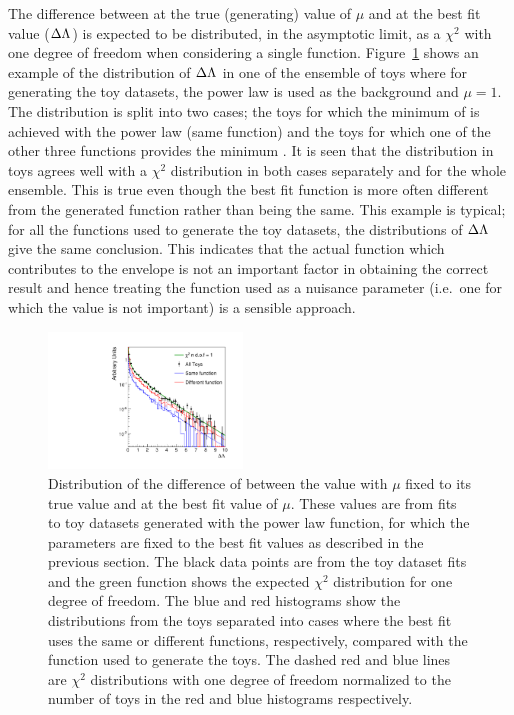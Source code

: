 The difference between \nll at the true (generating) value of $\mu$ and at the best fit value ($\Delta\Lambda$) is expected to be distributed, in the 
asymptotic limit, as a $\chi^{2}$ with one degree of freedom when considering a single function.
Figure~\ref{fig:functions:chisq} shows an example of the distribution of $\Delta\Lambda$ in one of the ensemble of toys where for generating the toy datasets, 
the power law is used as the background and $\mu=1$. The distribution is split into two cases; the toys for which the minimum of \nll is achieved with the 
power law (same function) and the toys for which one of the other three functions provides the minimum \nll.
It is seen that the distribution in toys agrees well with a $\chi^2$ distribution in both cases separately and for the whole ensemble. 
This is true even though the best fit function is more often different from the generated function rather than being the same.
This example is typical; for all the functions used to generate the toy datasets, the distributions of $\Delta\Lambda$ give the same conclusion.
This indicates that the actual function which contributes to the envelope is not an important factor in obtaining the correct result
and hence treating the function used as a nuisance parameter (i.e.~one for which the value is not important) is a sensible approach. 
%
\begin{figure}[tbp]
\centering
\includegraphics[width=0.46\textwidth]{functions/gen_pow1_mu1_bias_hists_2parfamily_Correcion_0.pdf}
\caption{Distribution of the difference of \nll between the \nll value with $\mu$ fixed to its true value and \nll at the best fit value
of $\mu$. These values are from fits to toy datasets generated with the power law function, for which the parameters are fixed to the best fit values as described in the previous section.
The black data points are from the toy dataset fits and the green function
shows the expected $\chi^2$ distribution for one degree of freedom. The blue and red histograms show the distributions from the toys 
separated into cases where the best fit uses the same or different functions, respectively, compared with the function used to generate the toys. 
The dashed red and blue lines are $\chi^{2}$ distributions with one degree of freedom normalized to the number of toys in the red and blue histograms respectively.}
\label{fig:functions:chisq}
\end{figure}

